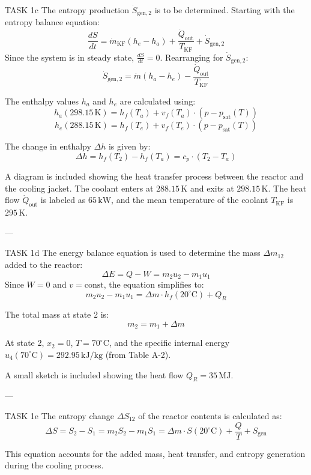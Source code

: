 TASK 1c  
The entropy production \( \dot{S}_{\text{gen},2} \) is to be determined. Starting with the entropy balance equation:  
\[
\frac{dS}{dt} = \dot{m}_{\text{KF}} (h_e - h_a) + \frac{\dot{Q}_{\text{out}}}{T_{\text{KF}}} + \dot{S}_{\text{gen},2}
\]  
Since the system is in steady state, \( \frac{dS}{dt} = 0 \). Rearranging for \( \dot{S}_{\text{gen},2} \):  
\[
\dot{S}_{\text{gen},2} = \dot{m} (h_a - h_e) - \frac{\dot{Q}_{\text{out}}}{T_{\text{KF}}}
\]  

The enthalpy values \( h_a \) and \( h_e \) are calculated using:  
\[
h_a(298.15 \, \text{K}) = h_f(T_a) + v_f(T_a) \cdot (p - p_{\text{sat}}(T))
\]  
\[
h_e(288.15 \, \text{K}) = h_f(T_e) + v_f(T_e) \cdot (p - p_{\text{sat}}(T))
\]  

The change in enthalpy \( \Delta h \) is given by:  
\[
\Delta h = h_f(T_2) - h_f(T_a) = c_p \cdot (T_2 - T_a)
\]  

A diagram is included showing the heat transfer process between the reactor and the cooling jacket. The coolant enters at \( 288.15 \, \text{K} \) and exits at \( 298.15 \, \text{K} \). The heat flow \( \dot{Q}_{\text{out}} \) is labeled as \( 65 \, \text{kW} \), and the mean temperature of the coolant \( T_{\text{KF}} \) is \( 295 \, \text{K} \).  

---

TASK 1d  
The energy balance equation is used to determine the mass \( \Delta m_{12} \) added to the reactor:  
\[
\Delta E = Q - W = m_2 u_2 - m_1 u_1
\]  
Since \( W = 0 \) and \( v = \text{const} \), the equation simplifies to:  
\[
m_2 u_2 - m_1 u_1 = \Delta m \cdot h_f(20^\circ\text{C}) + Q_R
\]  

The total mass at state 2 is:  
\[
m_2 = m_1 + \Delta m
\]  

At state 2, \( x_2 = 0 \), \( T = 70^\circ\text{C} \), and the specific internal energy \( u_4(70^\circ\text{C}) = 292.95 \, \text{kJ/kg} \) (from Table A-2).  

A small sketch is included showing the heat flow \( Q_R = 35 \, \text{MJ} \).  

---

TASK 1e  
The entropy change \( \Delta S_{12} \) of the reactor contents is calculated as:  
\[
\Delta S = S_2 - S_1 = m_2 S_2 - m_1 S_1 = \Delta m \cdot S(20^\circ\text{C}) + \frac{Q}{T} + S_{\text{gen}}
\]  

This equation accounts for the added mass, heat transfer, and entropy generation during the cooling process.